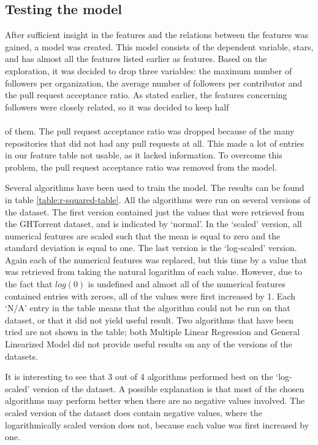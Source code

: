     \subsection{Testing the model}
        After sufficient insight in the features and the relations between the features was gained, a model was created. 
        This model consists of the dependent variable, stars, and has almost all the features listed earlier as features. 
        Based on the exploration, it was decided to drop three variables: the maximum number of followers per organization, the average number of followers per contributor and the pull request acceptance ratio.
        As stated earlier, the features concerning followers were closely related, so it was decided to keep half  \\\\ of them.
        The pull request acceptance ratio was dropped because of the many repositories that did not had any pull requests at all. 
        This made a lot of entries in our feature table not usable, as it lacked information. 
        To overcome this problem, the pull request acceptance ratio was removed from the model.
        
        Several algorithms have been used to train the model. 
        The results can be found in table \ref{table:r-squared-table}.
        All the algorithms were run on several versions of the dataset. The first version contained just the values that were retrieved from the GHTorrent dataset, and is indicated by `normal'. 
        In the `scaled' version, all numerical features are scaled such that the mean is equal to zero and the standard deviation is equal to one. 
        The last version is the `log-scaled' version. 
        Again each of the numerical features was replaced, but this time by a value that was retrieved from taking the natural logarithm of each value.
        However, due to the fact that $log(0)$ is undefined and almost all of the numerical features contained entries with zeroes, all of the values were first increased by 1.
        Each `N/A' entry in the table means that the algorithm could not be run on that dataset, or that it did not yield useful result.
        Two algorithms that have been tried are not shown in the table; both Multiple Linear Regression and General Linearized Model did not provide useful results on any of the versions of the datasets.
        
        
        It is interesting to see that 3 out of 4 algorithms performed best on the `log-scaled' version of the dataset. A possible explanation is that most of the chosen algorithms may perform better when there are no negative values involved. The scaled version of the dataset does contain negative values, where the logarithmically scaled version does not, because each value was first increased by one.
        
